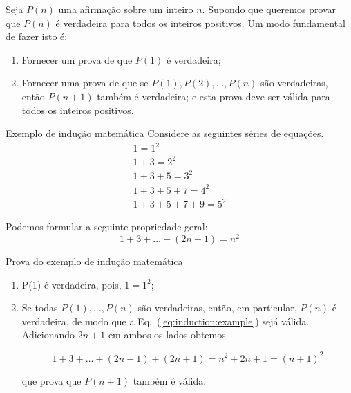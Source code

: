 

\begin{frame}{\insertlecture}
  
  Seja $P(n)$ uma afirmação sobre um inteiro $n$. Supondo que queremos
  provar que $P(n)$ é verdadeira para todos os inteiros positivos. Um 
  modo fundamental de fazer isto é:

  \begin{enumerate}
  \item Fornecer um prova de que $P(1)$ é verdadeira;
  \item Fornecer uma prova de que se $P(1), P(2), \dots, P(n)$ são 
    verdadeiras, então $P(n+1)$ também é verdadeira; e esta prova deve
    ser válida para todos os inteiros positivos.
  \end{enumerate}
\end{frame}

\begin{frame}{Exemplo de indução matemática}
Considere as seguintes séries de equações.\\

\[  
  \begin{array}{c}
    1=1^2 \\
    1+3=2^2\\
    1+3+5 = 3^2\\
    1+3+5+7 = 4^2\\
    1+3+5+7+9 = 5^2
  \end{array}
\]

\pause

Podemos formular a seguinte propriedade geral:\\

\begin{equation}
1+3+\dots+(2n-1) = n^2
\label{eq:induction:example}
\end{equation}

\end{frame}

\begin{frame}{Prova do exemplo de indução matemática}
  \begin{enumerate}
  \item<1-> P(1) é verdadeira, pois, $1=1^2$;
  \item<2> Se todas $P(1),\dots,P(n)$ são verdadeiras, então, 
    em particular, $P(n)$ é verdadeira, de modo que a 
    Eq.~(\ref{eq:induction:example}) sejá válida. Adicionando
    $2n+1$ em ambos os lados obtemos
    
    \[ 1+3+\dots+(2n-1)+(2n+1)=n^2+ 2n+1=(n+1)^2\]

  \bigskip
  que prova que $P(n+1)$ também é válida.
\end{enumerate}
\end{frame}

